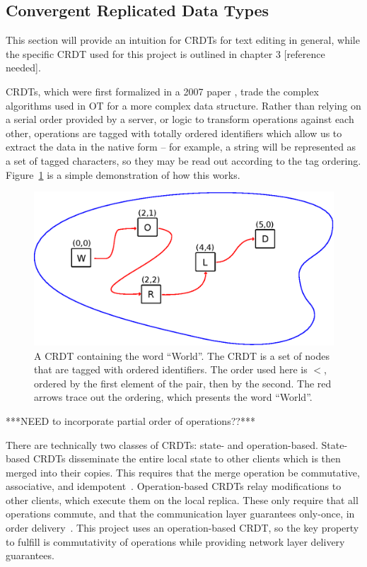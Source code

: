 \documentclass[12pt,a4paper,twoside,openright]{report}
\begin{document}
	
	
		
	\subsection{Convergent Replicated Data Types}
	
	This section will provide an intuition for CRDTs for text editing in general, while the specific CRDT used for this project is outlined in chapter 3 [reference needed].

	CRDTs, which were first formalized in a 2007 paper \cite{shapiro2007}, trade the complex algorithms used in OT for a more complex data structure. Rather than relying on a serial order provided by a server, or logic to transform operations against each other, operations are tagged with totally ordered identifiers which allow us to extract the data in the native form -- for example, a string will be represented as a set of tagged characters, so they may be read out according to the tag ordering. Figure~\ref{fig:taggedset} is a simple demonstration of how this works. 
	
	\begin{figure}[H]
	\centering
	\includegraphics[width=1\linewidth]{figs/tagged_set.eps}
	\caption[Text CRDT as a tagged set]{A CRDT containing the word ``World''. The CRDT is a set of nodes that are tagged with ordered identifiers. The order used here is $<$, ordered by the first element of the pair, then by the second. The red arrows trace out the ordering, which presents the word ``World''.}
	\label{fig:taggedset}
	\end{figure}
	
	***NEED to incorporate partial order of operations??***
	
	There are technically two classes of CRDTs: state- and operation-based. State-based CRDTs disseminate the entire local state to other clients which is then merged into their copies. This requires that the merge operation be commutative, associative, and idempotent~\cite{shapiro2011}. Operation-based CRDTs relay modifications to other clients, which execute them on the local replica. These only require that all operations commute, and that the communication layer guarantees only-once, in order delivery~\cite{takada2013}. This project uses an operation-based CRDT, so the key property to fulfill is commutativity of operations while providing network layer delivery guarantees.
	
\end{document}
